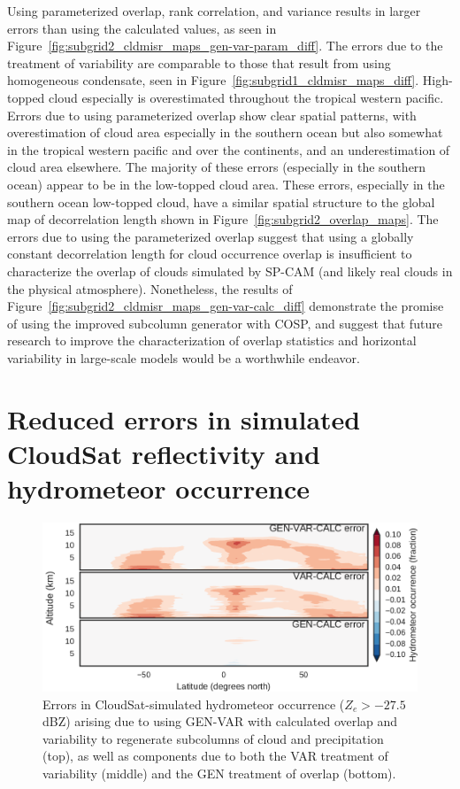 Using parameterized overlap, rank correlation, and variance results in
larger errors than using the calculated values, as seen in
Figure~\ref{fig:subgrid2_cldmisr_maps_gen-var-param_diff}. The errors
due to the treatment of variability are comparable to those that result
from using homogeneous condensate, seen in
Figure~\ref{fig:subgrid1_cldmisr_maps_diff}. High-topped cloud
especially is overestimated throughout the tropical western pacific.
Errors due to using parameterized overlap show clear spatial patterns,
with overestimation of cloud area especially in the southern ocean but
also somewhat in the tropical western pacific and over the continents,
and an underestimation of cloud area elsewhere. The majority of these
errors (especially in the southern ocean) appear to be in the low-topped
cloud area. These errors, especially in the southern ocean low-topped
cloud, have a similar spatial structure to the global map of
decorrelation length shown in Figure~\ref{fig:subgrid2_overlap_maps}.
The errors due to using the parameterized overlap suggest that using a
globally constant decorrelation length for cloud occurrence overlap is
insufficient to characterize the overlap of clouds simulated by SP-CAM
(and likely real clouds in the physical atmosphere). Nonetheless, the
results of Figure~\ref{fig:subgrid2_cldmisr_maps_gen-var-calc_diff}
demonstrate the promise of using the improved subcolumn generator with
COSP, and suggest that future research to improve the characterization
of overlap statistics and horizontal variability in large-scale models
would be a worthwhile endeavor.

\section{Reduced errors in simulated CloudSat reflectivity and
hydrometeor occurrence}\label{sec:subgrid2Active}

\begin{figure}[htbp]
\centering
\includegraphics{graphics/subgrid2_hfba_zonal_gen-var-calc_diff.pdf}
\caption{\label{fig:subgrid2_hfba_zonal_diff}Errors in
CloudSat-simulated hydrometeor occurrence (\(Z_e > -27.5\) dBZ) arising
due to using GEN-VAR with calculated overlap and variability to
regenerate subcolumns of cloud and precipitation (top), as well as
components due to both the VAR treatment of variability (middle) and the
GEN treatment of overlap
(bottom).}\label{fig:subgrid2ux5fhfbaux5fzonalux5fdiff}
\end{figure}

